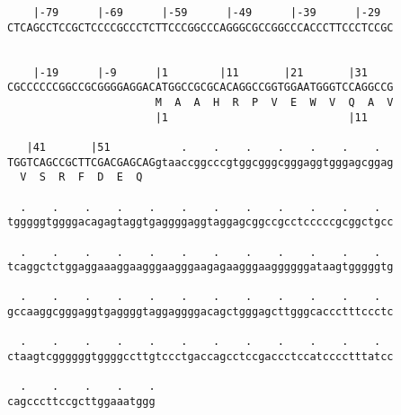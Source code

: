 \documentclass{article}
\begin{document}
\begin{Verbatim}
    |-79      |-69      |-59      |-49      |-39      |-29  
CTCAGCCTCCGCTCCCCGCCCTCTTCCCGGCCCAGGGCGCCGGCCCACCCTTCCCTCCGC
  
  
    |-19      |-9      |1        |11       |21       |31    
CGCCCCCCGGCCGCGGGGAGGACATGGCCGCGCACAGGCCGGTGGAATGGGTCCAGGCCG
                       M  A  A  H  R  P  V  E  W  V  Q  A  V
                       |1                            |11    
  
   |41       |51           .    .    .    .    .    .    .  
TGGTCAGCCGCTTCGACGAGCAGgtaaccggcccgtggcgggcgggaggtgggagcggag
  V  S  R  F  D  E  Q                                       
  
  .    .    .    .    .    .    .    .    .    .    .    .  
tgggggtggggacagagtaggtgaggggaggtaggagcggccgcctcccccgcggctgcc
  
  .    .    .    .    .    .    .    .    .    .    .    .  
tcaggctctggaggaaaggaagggaagggaagagaagggaaggggggataagtgggggtg
  
  .    .    .    .    .    .    .    .    .    .    .    .  
gccaaggcgggaggtgaggggtaggaggggacagctgggagcttgggcaccctttccctc
  
  .    .    .    .    .    .    .    .    .    .    .    .  
ctaagtcggggggtggggccttgtccctgaccagcctccgaccctccatcccctttatcc
  
  .    .    .    .    .
cagcccttccgcttggaaatggg
\end{Verbatim}
\newpage
\end{document}
